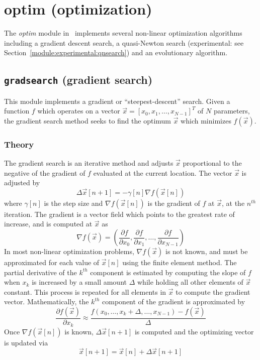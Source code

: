 % 
%

\newpage
\section{optim (optimization)}
\label{module:optim}
The {\em optim} module in \liquid\ implements several non-linear
optimization algorithms including
a gradient descent search,
a quasi-Newton search (experimental:
  see Section~\ref{module:experimental:qnsearch})
and an evolutionary algorithm.

\subsection{{\tt gradsearch} (gradient search)}
\label{module:optim:gradsearch}
This module implements a gradient or ``steepest-descent'' search.
Given a function $f$ which operates on a vector
$\vec{x} = [x_0,x_1,\ldots,x_{N-1}]^T$ of $N$ parameters,
the gradient search method seeks to find the optimum $\vec{x}$ which
minimizes $f(\vec{x})$.

\subsubsection{Theory}
The gradient search is an iterative method and adjusts $\vec{x}$ proportional
to the negative of the gradient of $f$ evaluated at the current location.
The vector $\vec{x}$ is adjusted by
\[
    \Delta \vec{x}[n+1] = -\gamma[n] \nabla f(\vec{x}[n])
\]
where $\gamma[n]$ is the step size and
$\nabla f(\vec{x}[n])$ is the gradient of $f$ at $\vec{x}$, at the $n^{th}$
iteration.
The gradient is a vector field which points to the greatest rate of increase,
and is computed at $\vec{x}$ as
\[
    \nabla f(\vec{x}) = \left(
        \frac{\partial f}{\partial x_0},
        \frac{\partial f}{\partial x_1},
        \ldots,
        \frac{\partial f}{\partial x_{N-1}}
    \right)
\]
In most non-linear optimization problems, $\nabla f(\vec{x})$ is not known,
and must be approximated for each value of $\vec{x}[n]$ using the finite element
method.
The partial derivative of the $k^{th}$ component is estimated by computing the
slope of $f$ when $x_k$ is increased by a small amount $\Delta$ while holding
all other elements of $\vec{x}$ constant.
This process is repeated for all elements in $\vec{x}$ to compute the gradient
vector.
Mathematically, the $k^{th}$ component of the gradient is approximated by
\[
    \frac{\partial f(\vec{x})}{\partial x_k} \approx 
    \frac{f(x_0,\ldots,x_k+\Delta,\ldots,x_{N-1}) - f(\vec{x})}{\Delta}
\]
Once $\nabla f(\vec{x}[n])$ is known, $\Delta\vec{x}[n+1]$ is computed and the
optimizing vector is updated via
\[
    \vec{x}[n+1] = \vec{x}[n] + \Delta\vec{x}[n+1]
\]

